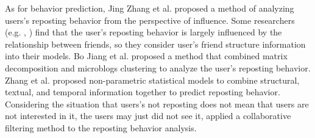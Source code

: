 As for behavior prediction, Jing Zhang et al.\cite{IEEEexample:journals/tkdd/ZhangTLLX15} proposed a method of analyzing users's reposting behavior from the perspective of influence. Some researchers (e.g. \cite{IEEEexample:conf/wsdm/FengW13}, \cite{IEEEexample:conf/ijcai/ZhangLTCL13}) find that the user's reposting behavior is largely influenced by the relationship between friends, so they consider user's friend structure information into their models. Bo Jiang et al. \cite{IEEEexample:conf/cikm/JiangLSW15} proposed a method that combined matrix decomposition and microblogs clustering to analyze the user's reposting behavior. Zhang et al.\cite{IEEEexample:zhang2015retweet} proposed non-parametric statistical models to combine structural, textual, and temporal information together to predict reposting behavior. Considering the situation that users's not reposting does not mean that users are not interested in it, the users may just did not see it, \cite{IEEEexample:conf/sigir/JiangLSLLMW16} applied a collaborative filtering method to the reposting behavior analysis.
